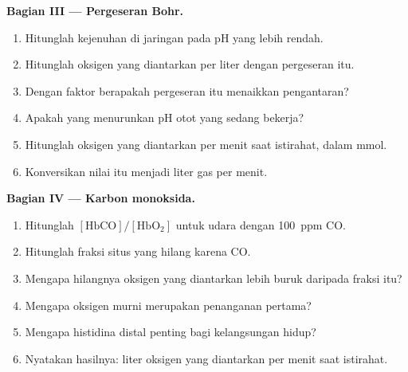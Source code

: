 \begin{problem}
\medskip\noindent\textbf{Bagian III --- Pergeseran Bohr.}
\begin{enumerate}[resume, beginpenalty=10000]
  \item Hitunglah kejenuhan di jaringan pada pH yang lebih rendah.
  \item Hitunglah oksigen yang diantarkan per liter dengan pergeseran itu.
  \item Dengan faktor berapakah pergeseran itu menaikkan pengantaran?
  \item Apakah yang menurunkan pH otot yang sedang bekerja?
  \item Hitunglah oksigen yang diantarkan per menit saat istirahat, dalam mmol.
  \item Konversikan nilai itu menjadi liter gas per menit.
\end{enumerate}

\medskip\noindent\textbf{Bagian IV --- Karbon monoksida.}
\begin{enumerate}[resume, beginpenalty=10000]
  \item Hitunglah $[\mathrm{HbCO}]/[\mathrm{HbO_2}]$ untuk udara dengan \qty{100}{ppm} CO.
  \item Hitunglah fraksi situs yang hilang karena CO.
  \item Mengapa hilangnya oksigen yang diantarkan lebih buruk daripada fraksi itu?
  \item Mengapa oksigen murni merupakan penanganan pertama?
  \item Mengapa histidina distal penting bagi kelangsungan hidup?
  \item Nyatakan hasilnya: liter oksigen yang diantarkan per menit saat istirahat.
\end{enumerate}
\end{problem}
